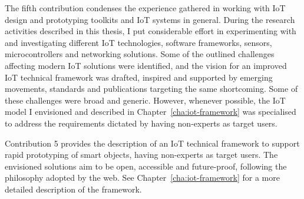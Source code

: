 The fifth contribution condenses the experience gathered in working with IoT design and prototyping toolkits and IoT systems in general. During the research activities described in this thesis, I put considerable effort in experimenting with and investigating different IoT technologies, software frameworks, sensors, microcontrollers and networking solutions. Some of the outlined challenges affecting modern IoT solutions were identified, and the vision for an improved IoT technical framework was drafted, inspired and supported by emerging movements, standards and publications targeting the same shortcoming. Some of these challenges were broad and generic. However, whenever possible, the IoT model I envisioned and described in Chapter~\ref{cha:iot-framework} was specialised to address the requirements dictated by having non-experts as target users.

Contribution 5 provides the description of an IoT technical framework to support rapid prototyping of smart objects, having non-experts as target users. The envisioned solutions aim to be open, accessible and future-proof, following the philosophy adopted by the web. See Chapter~\ref{cha:iot-framework} for a more detailed description of the framework.